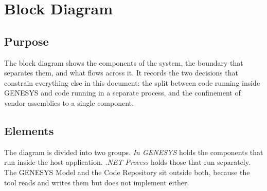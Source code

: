 \chapter{Block Diagram}
\label{ch:block}

\section{Purpose}

The block diagram shows the components of the system, the boundary that
separates them, and what flows across it. It records the two decisions that
constrain everything else in this document: the split between code running
inside GENESYS and code running in a separate process, and the confinement of
vendor assemblies to a single component.


\section{Elements}

The diagram is divided into two groups. \emph{In GENESYS} holds the components
that run inside the host application. \emph{.NET Process} holds those that run
separately. The GENESYS Model and the Code Repository sit outside both, because
the tool reads and writes them but does not implement either.

